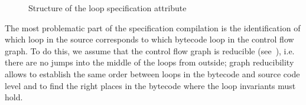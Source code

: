 \begin{figure}[t]



\caption{\sc Structure of the loop specification attribute}
\label{loopAttribute}

\end{figure}
 The most problematic part of the specification compilation is the identification of
 which loop in the source corresponds to which bytecode loop in the control flow
 graph. To do this, we assume that the control flow graph is reducible (see~\cite{ARUCom1986}), 
i.e. there are no jumps into the middle of the loops from outside; graph reducibility allows to establish the same order between loops in the
 bytecode and source code level and to find the right places in the bytecode where the loop invariants must hold.


